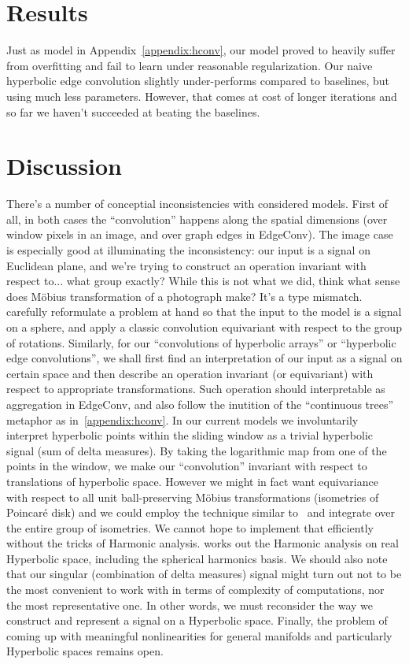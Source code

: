 \section{Results} \label{sec:results}

Just as model in Appendix~\autoref{appendix:hconv}, our model proved to heavily
suffer from overfitting and fail to learn under reasonable regularization.  Our
naive hyperbolic edge convolution slightly under-performs compared to
baselines, but using much less parameters. However, that comes at cost of
longer iterations and so far we haven't succeeded at beating the baselines.

\section{Discussion} \label{sec:discussion}

There's a number of conceptial inconsistencies with considered models.  First
of all, in both cases the ``convolution'' happens along the spatial dimensions
(over window pixels in an image, and over graph edges in EdgeConv). The image
case is especially good at illuminating the inconsistency: our input is a
signal on Euclidean plane, and we're trying to construct an operation invariant
with respect to... what group exactly? While this is not what we did, think
what sense does M\"obius transformation of a photograph make? It's a type
mismatch.
\citet{s2cnn} carefully reformulate a problem at hand so that the input to the
model is a signal on a sphere, and apply a classic convolution equivariant with
respect to the group of rotations. Similarly, for our ``convolutions of
hyperbolic arrays'' or ``hyperbolic edge convolutions'', we shall first find an
interpretation of our input as a signal on certain space and then describe an
operation invariant (or equivariant) with respect to appropriate
transformations. Such operation should interpretable as aggregation in EdgeConv,
and also follow the inutition of the ``continuous trees'' metaphor as
in~\autoref{appendix:hconv}. In our current models we involuntarily interpret
hyperbolic points within the sliding window as a trivial hyperbolic signal (sum
of delta measures). By taking the logarithmic map from one of the points in the
window, we make our ``convolution'' invariant with respect to translations of
hyperbolic space. However we might in fact want equivariance with respect to
all unit ball-preserving M\"obius transformations (isometries of Poincar\'e disk)
and we could employ the technique similar to~\cite{s2cnn} and integrate
over the entire group of isometries. We cannot hope to implement that efficiently
without the tricks of Harmonic analysis. \citet{stollharmonic} works out the
Harmonic analysis on real Hyperbolic space, including the spherical harmonics
basis. We should also note that our singular (combination of delta measures)
signal might turn out not to be the most convenient to work with in terms of
complexity of computations, nor the most representative one. In other words, we
must reconsider the way we construct and represent a signal on a Hyperbolic
space. Finally, the problem of coming up with meaningful nonlinearities
for general manifolds and particularly Hyperbolic spaces remains open.
